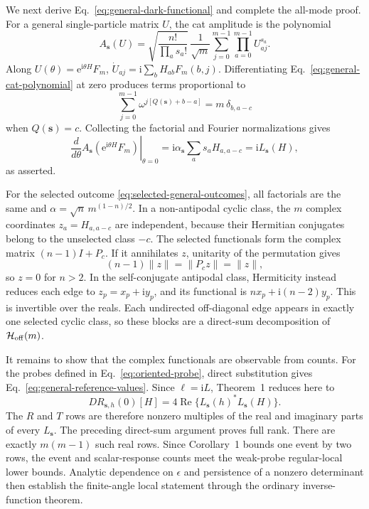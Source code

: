 \documentclass[aps,pra,reprint,amsmath,amssymb,superscriptaddress,longbibliography]{revtex4-2}
\newcommand{\ii}{\mathrm{i}}
\newcommand{\ee}{\mathrm{e}}
\begin{document}
We next derive Eq.~\eqref{eq:general-dark-functional} and complete the
all-mode proof.  For a general single-particle matrix $U$, the cat amplitude
is the polynomial
\begin{equation}
 A_{\bm s}(U)=
 \sqrt{\frac{n!}{\prod_as_a!}}\,\frac1{\sqrt m}
 \sum_{j=0}^{m-1}\prod_{a=0}^{m-1}U_{aj}^{s_a}.
\label{eq:general-cat-polynomial}
\end{equation}
Along $U(\theta)=\ee^{\ii\theta H}F_m$,
$\dot U_{aj}=\ii\sum_bH_{ab}F_m(b,j)$.  Differentiating
Eq.~\eqref{eq:general-cat-polynomial} at zero produces terms proportional
to
\begin{equation}
 \sum_{j=0}^{m-1}\omega^{j[Q(\bm s)+b-a]}
 =m\,\delta_{b,a-c}
\end{equation}
when $Q(\bm s)=c$.  Collecting the factorial and Fourier normalizations
gives
\begin{equation}
 \left.\frac{d}{d\theta}A_{\bm s}
   (\ee^{\ii\theta H}F_m)\right|_{\theta=0}
 =\ii\alpha_{\bm s}\sum_as_aH_{a,a-c}
 =\ii L_{\bm s}(H),
\label{eq:general-cat-gradient}
\end{equation}
as asserted.

For the selected outcome \eqref{eq:selected-general-outcomes}, all
factorials are the same and
$\alpha=\sqrt n\,m^{(1-n)/2}$.  In a non-antipodal cyclic class, the
$m$ complex coordinates $z_a=H_{a,a-c}$ are independent, because their
Hermitian conjugates belong to the unselected class $-c$.  The selected
functionals form the complex matrix $(n-1)I+P_c$.  If it annihilates $z$,
unitarity of the permutation gives
\begin{equation}
 (n-1)\|z\|=\|P_cz\|=\|z\|,
\end{equation}
so $z=0$ for $n>2$.  In the self-conjugate antipodal class, Hermiticity
instead reduces each edge to $z_p=x_p+\ii y_p$, and its functional is
$nx_p+\ii(n-2)y_p$.  This is invertible over the reals.  Each undirected
off-diagonal edge appears in exactly one selected cyclic class, so these
blocks are a direct-sum decomposition of ${\cal H}_{\rm off}(m)$.

It remains to show that the complex functionals are observable from counts.
For the probes defined in Eq.~\eqref{eq:oriented-probe}, direct substitution
gives Eq.~\eqref{eq:general-reference-values}.  Since
$\ell=\ii L$, Theorem~1 reduces here to
\begin{equation}
 D R_{\bm s,h}(0)[H]
 =4\operatorname{Re}\{L_{\bm s}(h)^*L_{\bm s}(H)\}.
\label{eq:general-cat-response}
\end{equation}
The $R$ and $T$ rows are therefore nonzero multiples of the real and
imaginary parts of every $L_{\bm s}$.  The preceding direct-sum argument
proves full rank.  There are exactly $m(m-1)$ such real rows.  Since
Corollary~1 bounds one event by two rows, the event and scalar-response
counts meet the weak-probe regular-local lower bounds.  Analytic dependence
on $\epsilon$ and persistence of a nonzero determinant then establish the
finite-angle local statement through the ordinary inverse-function theorem.
\end{document}
